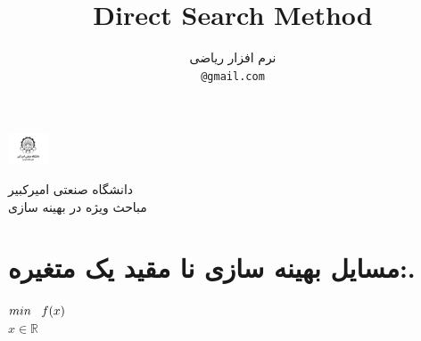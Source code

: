 \documentclass{article}
\title{Direct Search Method}
\author{%

   نرم افزار ریاضی\\

  \texttt{@gmail.com} \\
}
\begin{document}
\baselineskip=0.7cm

\begin{minipage}{0.1\textwidth}%
\includegraphics[width=1.2cm]{Amirkabir.jpg}
\end{minipage}%
\hfill%
\begin{minipage}{0.9\textwidth}\raggedleft
دانشگاه صنعتی امیرکبیر\\
مباحث ویژه در بهینه سازی\\
\end{minipage}


\makepertitle



\section*{مسایل بهینه سازی نا مقید یک متغیره:.}
\begin{flushleft}
$min \hspace{3mm}f(x)$\\
$x \in \mathbb{R}$
\end{flushleft}
\end{document}
